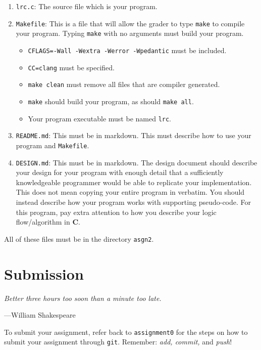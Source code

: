 \documentclass{article}
\begin{document}
\begin{enumerate}
\item \texttt{lrc.c}: The source file which is your program.

\item \texttt{Makefile}: This is a file that will allow the grader to type
    \texttt{make} to compile your program. Typing \texttt{make} with no
    arguments must build your program.
\begin{itemize}
\item \texttt{CFLAGS=-Wall -Wextra -Werror -Wpedantic} must be included.
\item \texttt{CC=clang} must be specified.
\item \texttt{make clean} must remove all files that are compiler generated.
\item \texttt{make} should build your program, as should \texttt{make all}.
\item Your program executable must be named \texttt{lrc}.
\end{itemize}

\item \texttt{README.md}: This must be in markdown.
This must describe how to use your program and \texttt{Makefile}.

\item \texttt{DESIGN.md}: This must be in markdown. The design document
should describe your design for your program with enough detail
that a sufficiently knowledgeable programmer would be able to
replicate your implementation. This does not mean copying your
entire program in verbatim. You should instead describe how your
program works with supporting pseudo-code. For this program, pay
extra attention to how you describe your logic flow/algorithm in
\textbf{C}.

\end{enumerate}

All of these files must be in the directory \texttt{asgn2}.


\section{Submission}
\textwidth
\epigraph{\emph{Better three hours too soon than a minute too
late.}}{---William Shakespeare}

To submit your assignment, refer back to \texttt{assignment0} for the steps on how to submit your assignment through \texttt{git}. Remember: \emph{add, commit,} and \emph{push}!
\end{document}

